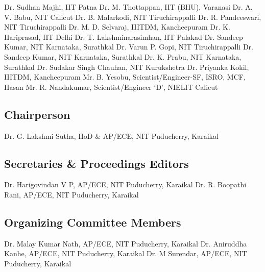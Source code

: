 \documentclass[12pt,a3paper, foldmark,notumble]{leaflet}
\begin{document}
Dr. Sudhan Majhi, IIT Patna \newline
Dr. M. Thottappan, IIT (BHU), Varanasi \newline
Dr. A. V. Babu, NIT Calicut \newline
Dr. B. Malarkodi, NIT Tiruchirappalli \newline
Dr. R. Pandeeswari, NIT Tiruchirappalli \newline
Dr. M. D. Selvaraj, IIITDM, Kancheepuram \newline
Dr. K. Hariprasad, IIT Delhi \newline
Dr. T. Lakshminarasimhan, IIT Palakad \newline
Dr. Sandeep Kumar, NIT Karnataka, Surathkal \newline
Dr. Varun P. Gopi, NIT Tiruchirappalli \newline
Dr. Sandeep Kumar, NIT Karnataka, Surathkal \newline
Dr. K. Prabu, NIT Karnataka, Surathkal \newline
Dr. Sudakar Singh Chauhan, NIT Kurukshetra\newline
Dr. Priyanka Kokil, IIITDM, Kancheepuram \newline
Mr. B. Yesobu, Scientist/Engineer-SF, ISRO, MCF, Hasan \newline
Mr. R. Nandakumar, Scientist/Engineer ‘D’, NIELIT Calicut

\vspace{-0.25cm}
\subsection{Chairperson}
Dr. G. Lakshmi Sutha, HoD \& AP/ECE, NIT Puducherry, Karaikal 

\vspace{-0.25cm}
\subsection{Secretaries  \& Proceedings Editors}
Dr. Harigovindan V P, AP/ECE, NIT Puducherry, Karaikal  \newline
Dr. R. Boopathi Rani, AP/ECE, NIT Puducherry, Karaikal 

\vspace{-0.25cm}
\subsection{Organizing Committee Members}
Dr. Malay Kumar Nath, AP/ECE, NIT Puducherry, Karaikal\newline
Dr. Aniruddha Kanhe, AP/ECE, NIT Puducherry, Karaikal\newline
Dr. M Surendar, AP/ECE, NIT Puducherry, Karaikal
\end{document}
